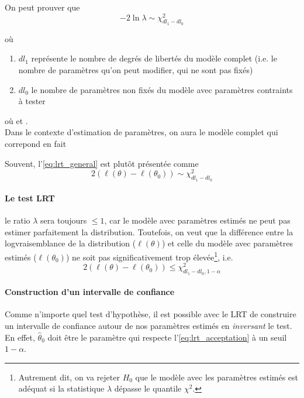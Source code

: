 \documentclass[12pt, french]{report}
\begin{document}
On peut prouver que
\begin{equation}
\label{eq:lrt_general}
-2 \ln \lambda  \sim \chi_{dl_1 - dl_0}^2
\end{equation}

où
\begin{enumerate}[label=\faAngleRight]
\item $dl_1$ représente le nombre de degrés de libertés du modèle complet (i.e. le nombre de paramètres qu'on peut modifier, qui ne sont pas fixés)
\item $dl_0$ le nombre de paramètres non fixés du modèle avec paramètres contraints à tester

\end{enumerate}

où  et .  \\

Dans le contexte d'estimation de paramètres, on aura le modèle complet  qui correpond en fait 

Souvent, l'\autoref{eq:lrt_general} est plutôt présentée comme
\begin{equation}
\label{eq:lrt_appliquée}
2 \left( \ell(\theta) - \ell(\theta_0) \right) \sim \chi_{dl_1 - dl_0}^2
\end{equation}

\paragraph{Le test LRT} le ratio $\lambda$ sera toujours $\leq 1$, car le modèle avec paramètres estimés ne peut pas estimer parfaitement la distribution. Toutefois, on veut que la différence entre la logvraisemblance de la distribution ($\ell(\theta)$) et celle du modèle avec paramètres estimés ($\ell(\theta_0)$) ne soit pas significativement trop élevée\footnote{Autrement dit, on va rejeter $H_0$ que le modèle avec les paramètres estimés est adéquat si la statistique $\lambda$ dépasse le quantile $\chi^2$.}, i.e.
\begin{equation}
\label{eq:lrt_acceptation}
2 \left( \ell(\theta) - \ell(\theta_0) \right) \leq  \chi_{dl_1 - dl_0, 1-\alpha}^2
\end{equation}


\paragraph{Construction d'un intervalle de confiance} Comme n'importe quel test d'hypothèse, il est possible avec le LRT de construire un intervalle de confiance autour de nos paramètres estimés en \emph{inversant} le test. En effet, $\hat{\theta}_0$ doit être le paramètre qui respecte l'\autoref{eq:lrt_acceptation} à un seuil $1 - \alpha$.
\end{document}
